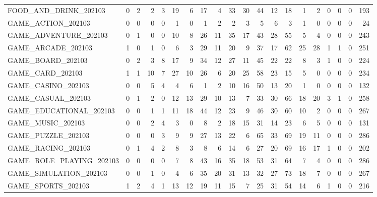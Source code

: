 \begin{tabular}{lrrrrrrrrrrrrrrrrrrr}
FOOD\_AND\_DRINK\_202103      &  0 &  2 &  2 &  3 &  19 &  6 &  17 &  4 &  33 &  30 &  44 &  12 &  18 &  1 &  2 &  0 &  0 &  0 &  193 \\
GAME\_ACTION\_202103         &  0 &  0 &  0 &  0 &  1 &  0 &  1 &  2 &  2 &  3 &  5 &  6 &  3 &  1 &  0 &  0 &  0 &  0 &  24 \\
GAME\_ADVENTURE\_202103      &  0 &  1 &  0 &  0 &  10 &  8 &  26 &  11 &  35 &  17 &  43 &  28 &  55 &  5 &  4 &  0 &  0 &  0 &  243 \\
GAME\_ARCADE\_202103         &  1 &  0 &  1 &  0 &  6 &  3 &  29 &  11 &  20 &  9 &  37 &  17 &  62 &  25 &  28 &  1 &  1 &  0 &  251 \\
GAME\_BOARD\_202103          &  0 &  2 &  3 &  8 &  17 &  9 &  34 &  12 &  27 &  11 &  45 &  22 &  22 &  8 &  3 &  1 &  0 &  0 &  224 \\
GAME\_CARD\_202103           &  1 &  1 &  10 &  7 &  27 &  10 &  26 &  6 &  20 &  25 &  58 &  23 &  15 &  5 &  0 &  0 &  0 &  0 &  234 \\
GAME\_CASINO\_202103         &  0 &  0 &  5 &  4 &  4 &  6 &  1 &  2 &  10 &  16 &  50 &  13 &  20 &  1 &  0 &  0 &  0 &  0 &  132 \\
GAME\_CASUAL\_202103         &  0 &  1 &  2 &  0 &  12 &  13 &  29 &  10 &  13 &  7 &  33 &  30 &  66 &  18 &  20 &  3 &  1 &  0 &  258 \\
GAME\_EDUCATIONAL\_202103    &  0 &  0 &  1 &  1 &  11 &  18 &  44 &  12 &  23 &  9 &  46 &  30 &  60 &  10 &  2 &  0 &  0 &  0 &  267 \\
GAME\_MUSIC\_202103          &  0 &  0 &  2 &  4 &  3 &  0 &  8 &  2 &  18 &  15 &  31 &  14 &  23 &  6 &  5 &  0 &  0 &  0 &  131 \\
GAME\_PUZZLE\_202103         &  0 &  0 &  0 &  3 &  9 &  9 &  27 &  13 &  22 &  6 &  65 &  33 &  69 &  19 &  11 &  0 &  0 &  0 &  286 \\
GAME\_RACING\_202103         &  0 &  1 &  4 &  2 &  8 &  3 &  8 &  6 &  14 &  6 &  27 &  20 &  69 &  16 &  17 &  1 &  0 &  0 &  202 \\
GAME\_ROLE\_PLAYING\_202103   &  0 &  0 &  0 &  0 &  7 &  8 &  43 &  16 &  35 &  18 &  53 &  31 &  64 &  7 &  4 &  0 &  0 &  0 &  286 \\
GAME\_SIMULATION\_202103     &  0 &  0 &  1 &  0 &  4 &  6 &  35 &  20 &  31 &  13 &  32 &  27 &  73 &  18 &  7 &  0 &  0 &  0 &  267 \\
GAME\_SPORTS\_202103         &  1 &  2 &  4 &  1 &  13 &  12 &  19 &  11 &  15 &  7 &  25 &  31 &  54 &  14 &  6 &  1 &  0 &  0 &  216 \\

\end{tabular}
